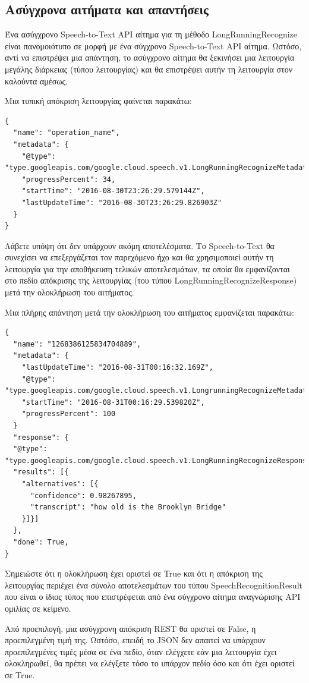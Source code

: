 \documentclass[oneside, 12pt]{book}
\begin{document}
\subsection{Ασύγχρονα αιτήματα και απαντήσεις}\label{subsec:ασύγχρονα-αιτήματα-και-απαντήσεις}
Ένα ασύγχρονο Speech-to-Text API αίτημα για τη μέθοδο LongRunningRecognize είναι πανομοιότυπο σε μορφή με ένα σύγχρονο Speech-to-Text API αίτημα. Ωστόσο, αντί να επιστρέψει μια απάντηση, το ασύγχρονο αίτημα θα ξεκινήσει μια λειτουργία μεγάλης διάρκειας (τύπου λειτουργίας) και θα επιστρέψει αυτήν τη λειτουργία στον καλούντα αμέσως.

Μια τυπική απόκριση λειτουργίας φαίνεται παρακάτω:
\begin{lstlisting}
{
  "name": "operation_name",
  "metadata": {
    "@type": "type.googleapis.com/google.cloud.speech.v1.LongRunningRecognizeMetadata"
    "progressPercent": 34,
    "startTime": "2016-08-30T23:26:29.579144Z",
    "lastUpdateTime": "2016-08-30T23:26:29.826903Z"
  }
}
\end{lstlisting}
Λάβετε υπόψη ότι δεν υπάρχουν ακόμη αποτελέσματα. Το Speech-to-Text θα συνεχίσει να επεξεργάζεται τον παρεχόμενο ήχο και θα χρησιμοποιεί αυτήν τη λειτουργία για την αποθήκευση τελικών αποτελεσμάτων, τα οποία θα εμφανίζονται στο πεδίο απόκρισης της λειτουργίας (του τύπου LongRunningRecognizeResponse) μετά την ολοκλήρωση του αιτήματος.

Μια πλήρης απάντηση μετά την ολοκλήρωση του αιτήματος εμφανίζεται παρακάτω:
\begin{lstlisting}
{
  "name": "1268386125834704889",
  "metadata": {
    "lastUpdateTime": "2016-08-31T00:16:32.169Z",
    "@type": "type.googleapis.com/google.cloud.speech.v1.LongrunningRecognizeMetadata",
    "startTime": "2016-08-31T00:16:29.539820Z",
    "progressPercent": 100
  }
  "response": {
  "@type": "type.googleapis.com/google.cloud.speech.v1.LongRunningRecognizeResponse",
  "results": [{
    "alternatives": [{
      "confidence": 0.98267895,
      "transcript": "how old is the Brooklyn Bridge"
    }]}]
  },
  "done": True,
}
\end{lstlisting}
Σημειώστε ότι η ολοκλήρωση έχει οριστεί σε True και ότι η απόκριση της λειτουργίας περιέχει ένα σύνολο αποτελεσμάτων του τύπου SpeechRecognitionResult που είναι ο ίδιος τύπος που επιστρέφεται από ένα σύγχρονο αίτημα αναγνώρισης API ομιλίας σε κείμενο.

Από προεπιλογή, μια ασύγχρονη απόκριση REST θα οριστεί σε False, η προεπιλεγμένη τιμή της. Ωστόσο, επειδή το JSON δεν απαιτεί να υπάρχουν προεπιλεγμένες τιμές μέσα σε ένα πεδίο, όταν ελέγχετε εάν μια λειτουργία έχει ολοκληρωθεί, θα πρέπει να ελέγξετε τόσο το υπάρχον πεδίο όσο και ότι έχει οριστεί σε True.
\end{document}
